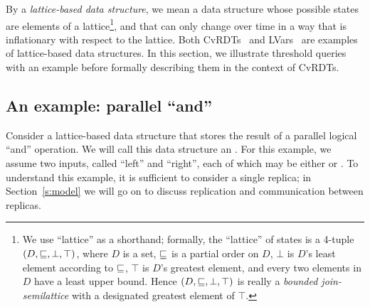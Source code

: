By a \emph{lattice-based data structure}, we mean a data structure
whose possible states are elements of a lattice\footnote{We use
  ``lattice'' as a shorthand; formally, the ``lattice'' of states is a
  4-tuple $(D, \sqsubseteq, \bot, \top)$, where $D$ is a set, $\sqsubseteq$
  is a partial order on $D$, $\bot$ is $D$'s least element according
  to $\sqsubseteq$, $\top$ is $D$'s greatest element, and every two
  elements in $D$ have a least upper bound.  Hence $(D, \sqsubseteq,
  \bot, \top)$ is really a \emph{bounded join-semilattice} with a
  designated greatest element of $\top$.}, and that can only change
over time in a way that is inflationary with respect to the lattice.
Both CvRDTs~\cite{crdts,crdts-tr} and
LVars~\cite{LVars-paper,Freeze-paper} are examples of lattice-based
data structures.
%
%
% 
% 
In this section, we illustrate 
threshold queries with an example before
formally describing them in the context of CvRDTs.

\subsection{An example: parallel ``and''}

Consider a lattice-based data structure that stores the result of a parallel logical ``and'' operation.
We will call this data structure an \emph{}.
For this example, we assume two inputs, called ``left'' and ``right'', 
each of which may be either  or .
%
%
{To understand this example, it is sufficient to consider a single replica;}
in Section~\ref{s:model} we will go on to
discuss replication and communication between replicas.
%

